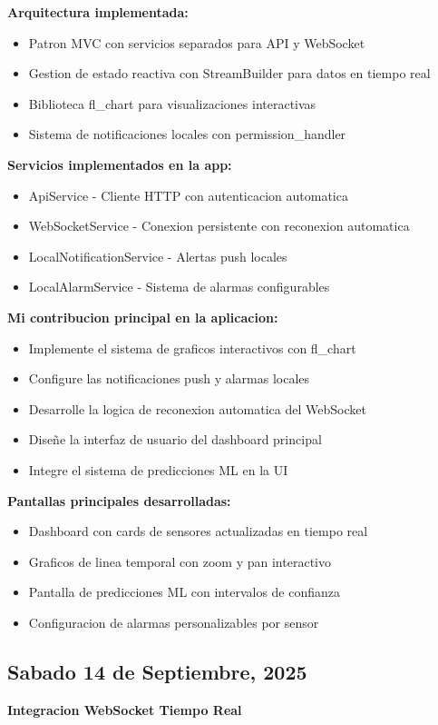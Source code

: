 \documentclass[11pt,letterpaper]{article}
\begin{document}
\textbf{Arquitectura implementada:}
\begin{itemize}
    \item Patron MVC con servicios separados para API y WebSocket
    \item Gestion de estado reactiva con StreamBuilder para datos en tiempo real
    \item Biblioteca fl\_chart para visualizaciones interactivas
    \item Sistema de notificaciones locales con permission\_handler
\end{itemize}

\textbf{Servicios implementados en la app:}
\begin{itemize}
    \item ApiService - Cliente HTTP con autenticacion automatica
    \item WebSocketService - Conexion persistente con reconexion automatica
    \item LocalNotificationService - Alertas push locales
    \item LocalAlarmService - Sistema de alarmas configurables
\end{itemize}

\textbf{Mi contribucion principal en la aplicacion:}
\begin{itemize}
    \item Implemente el sistema de graficos interactivos con fl\_chart
    \item Configure las notificaciones push y alarmas locales
    \item Desarrolle la logica de reconexion automatica del WebSocket
    \item Diseñe la interfaz de usuario del dashboard principal
    \item Integre el sistema de predicciones ML en la UI
\end{itemize}

\textbf{Pantallas principales desarrolladas:}
\begin{itemize}
    \item Dashboard con cards de sensores actualizadas en tiempo real
    \item Graficos de linea temporal con zoom y pan interactivo
    \item Pantalla de predicciones ML con intervalos de confianza
    \item Configuracion de alarmas personalizables por sensor
\end{itemize}

\subsection{Sabado 14 de Septiembre, 2025}
\textbf{Integracion WebSocket Tiempo Real}
\end{document}

